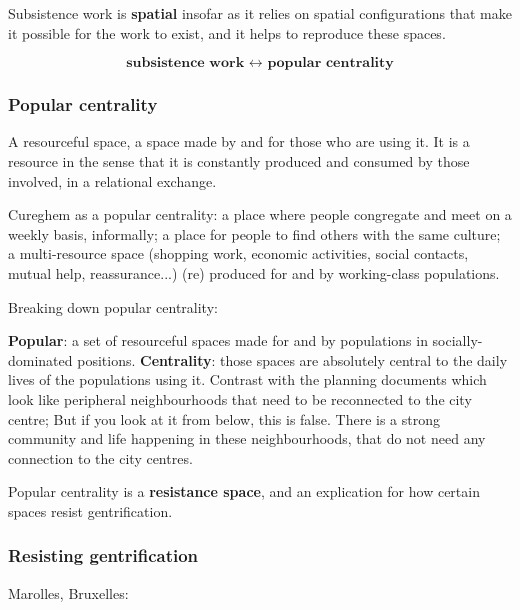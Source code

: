 \documentclass{article}
\begin{document}
Subsistence work is \textbf{spatial} insofar as it relies on spatial configurations that make it possible for the work to exist, and it helps to reproduce these spaces.

\[\textbf{subsistence work $\leftrightarrow$ popular centrality}\]

\subsubsection{Popular centrality}

A resourceful space, a space made by and for those who are using it. It is a resource in the sense that it is constantly produced and consumed by those involved, in a relational exchange.

Cureghem as a popular centrality: a place where people congregate and meet on a weekly basis, informally; a place for people to find others with the same culture; a multi-resource space (shopping work, economic activities, social contacts, mutual help, reassurance...) (re) produced for and by working-class populations.

Breaking down popular centrality:

\begin{outline}
	\1 \textbf{Popular}: a set of resourceful spaces made for and by populations in socially-dominated positions.
	\1 \textbf{Centrality}: those spaces are absolutely central to the daily lives of the populations using it. Contrast with the planning documents which look like peripheral neighbourhoods that need to be reconnected to the city centre; But if you look at it from below, this is false. There is a strong community and life happening in these neighbourhoods, that do not need any connection to the city centres.
\end{outline}

Popular centrality is a \textbf{resistance space}, and an explication for how certain spaces resist gentrification.

\subsubsection{Resisting gentrification}

Marolles, Bruxelles: 
\end{document}
